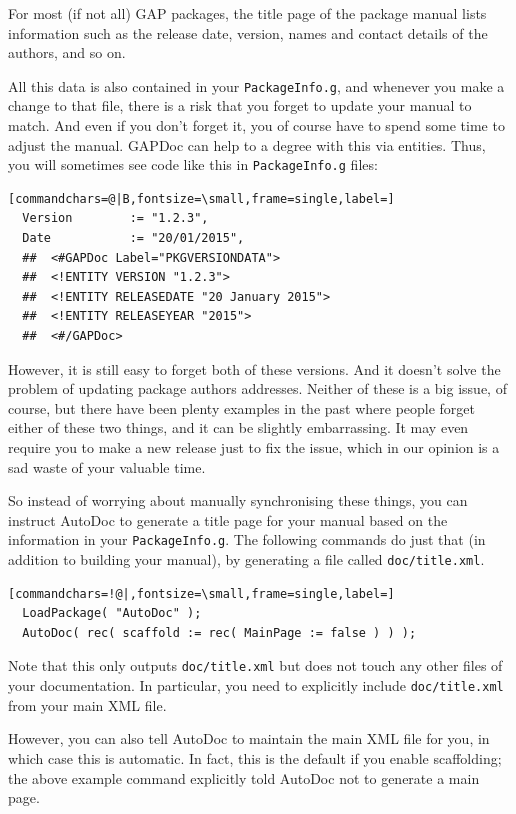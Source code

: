 \documentclass[a4paper,11pt]{report}
\begin{document}
{{{ For most (if not all) \textsf{GAP} packages, the title page of the package manual lists information such as the
release date, version, names and contact details of the authors, and so on. 

 All this data is also contained in your \texttt{PackageInfo.g}, and whenever you make a change to that file, there is a risk that you forget
to update your manual to match. And even if you don't forget it, you of course
have to spend some time to adjust the manual. \textsf{GAPDoc} can help to a degree with this via entities. Thus, you will sometimes see code
like this in \texttt{PackageInfo.g} files: 
\begin{Verbatim}[commandchars=@|B,fontsize=\small,frame=single,label=]
  Version        := "1.2.3",
  Date           := "20/01/2015",
  ##  <#GAPDoc Label="PKGVERSIONDATA">
  ##  <!ENTITY VERSION "1.2.3">
  ##  <!ENTITY RELEASEDATE "20 January 2015">
  ##  <!ENTITY RELEASEYEAR "2015">
  ##  <#/GAPDoc>
\end{Verbatim}
 However, it is still easy to forget both of these versions. And it doesn't
solve the problem of updating package authors addresses. Neither of these is a
big issue, of course, but there have been plenty examples in the past where
people forget either of these two things, and it can be slightly embarrassing.
It may even require you to make a new release just to fix the issue, which in
our opinion is a sad waste of your valuable time. 

 So instead of worrying about manually synchronising these things, you can
instruct \textsf{AutoDoc} to generate a title page for your manual based on the information in your \texttt{PackageInfo.g}. The following commands do just that (in addition to building your manual),
by generating a file called \texttt{doc/title.xml}. 
\begin{Verbatim}[commandchars=!@|,fontsize=\small,frame=single,label=]
  LoadPackage( "AutoDoc" );
  AutoDoc( rec( scaffold := rec( MainPage := false ) ) );
\end{Verbatim}
 Note that this only outputs \texttt{doc/title.xml} but does not touch any other files of your documentation. In particular, you
need to explicitly include \texttt{doc/title.xml} from your main XML file. 

 However, you can also tell \textsf{AutoDoc} to maintain the main XML file for you, in which case this is automatic. In
fact, this is the default if you enable scaffolding; the above example command
explicitly told \textsf{AutoDoc} not to generate a main page. 

}}}
\end{document}
